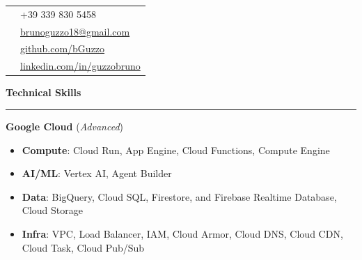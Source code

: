 \documentclass[9pt, a4paper]{article}
\newcommand{\cvsection}[1]{%
	\vspace{2pt}\par
	{\Large\bfseries\color{sectionblue}#1}\par
	\vspace{2pt}\hrule\vspace{6pt}
}
\begin{document}
	\begin{minipage}[t]{0.32\linewidth}
		\vspace{0pt} %
		
		\begin{center}
		\end{center}
		
		\begin{tabularx}{\linewidth}{@{}lX@{}}
			\faPhone & +39 339 830 5458 \\
			\faEnvelope & \href{mailto:brunoguzzo18@gmail.com}{brunoguzzo18@gmail.com} \\
			\faGithub & \href{https://github.com/bGuzzo}{github.com/bGuzzo} \\
			\faLinkedin & \href{https://www.linkedin.com/in/guzzobruno/}{linkedin.com/in/guzzobruno} \\
		\end{tabularx}
		\vspace{4pt}
		
		\cvsection{Technical Skills}
		
		{\bfseries Google Cloud} (\textit{Advanced})
		\begin{itemize}[leftmargin=*, nosep, itemsep=2pt]
			\footnotesize
			\item \textbf{Compute}: Cloud Run, App Engine, Cloud Functions, Compute Engine
			\item \textbf{AI/ML}: Vertex AI, Agent Builder
			\item \textbf{Data}: BigQuery, Cloud SQL, Firestore, and Firebase Realtime Database, Cloud Storage
			\item \textbf{Infra}: VPC, Load Balancer, IAM, Cloud Armor, Cloud DNS, Cloud CDN, Cloud Task, Cloud Pub/Sub
		\end{itemize}
		\vspace{4pt}
		

\end{minipage}
\end{document}
